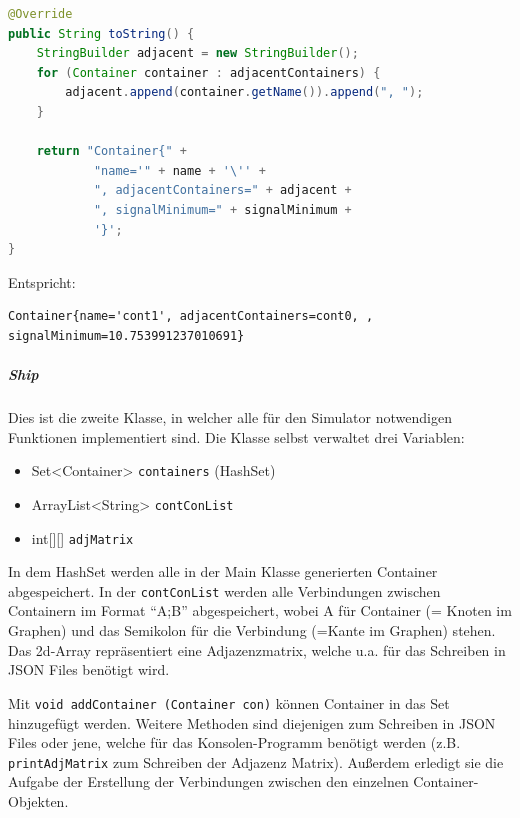 \documentclass[
    headings=optiontotocandhead,%
    twoside,
    numbers=noenddot,%
    12pt, %
    titlepage, %
    parskip=full, %
    listof=leveldown, 
    numbers=noenddot, %
    a4paper,DIV=14,
    BCOR=15mm,
]{scrbook}
\newcommand{\passthrough}[1]{#1}
\providecommand{\tightlist}{%
  \setlength{\itemsep}{0pt}\setlength{\parskip}{0pt}}
\begin{document}
\begin{lstlisting}[language=Java, caption={Überarbeitung der .toString Methode von Container}]
@Override
public String toString() {
    StringBuilder adjacent = new StringBuilder();
    for (Container container : adjacentContainers) {
        adjacent.append(container.getName()).append(", ");
    }
  
    return "Container{" +
            "name='" + name + '\'' +
            ", adjacentContainers=" + adjacent +
            ", signalMinimum=" + signalMinimum +
            '}';
}
\end{lstlisting}

Entspricht:

\begin{lstlisting}[caption={Ausgabe mittels toString von Container}]
Container{name='cont1', adjacentContainers=cont0, , signalMinimum=10.753991237010691}
\end{lstlisting}

\hypertarget{ship}{%
\subparagraph{Ship}\label{ship}}

Dies ist die zweite Klasse, in welcher alle für den Simulator
notwendigen Funktionen implementiert sind. Die Klasse selbst verwaltet
drei Variablen:

\begin{itemize}
\tightlist
\item
  Set\textless Container\textgreater{}
  \passthrough{\lstinline!containers!} (HashSet)
\item
  ArrayList\textless String\textgreater{}
  \passthrough{\lstinline!contConList!}
\item
  int{[}{]}{[}{]} \passthrough{\lstinline!adjMatrix!}
\end{itemize}

In dem HashSet werden alle in der Main Klasse generierten Container
abgespeichert. In der \passthrough{\lstinline!contConList!} werden alle
Verbindungen zwischen Containern im Format ``A;B'' abgespeichert, wobei
A für Container (= Knoten im Graphen) und das Semikolon für die
Verbindung (=Kante im Graphen) stehen. Das 2d-Array repräsentiert eine
Adjazenzmatrix, welche u.a. für das Schreiben in JSON Files benötigt
wird.

Mit \passthrough{\lstinline!void addContainer (Container con)!} können
Container in das Set hinzugefügt werden. Weitere Methoden sind
diejenigen zum Schreiben in JSON Files oder jene, welche für das
Konsolen-Programm benötigt werden (z.B.
\passthrough{\lstinline!printAdjMatrix!} zum Schreiben der Adjazenz
Matrix). Außerdem erledigt sie die Aufgabe der Erstellung der
Verbindungen zwischen den einzelnen Container-Objekten.
\end{document}
